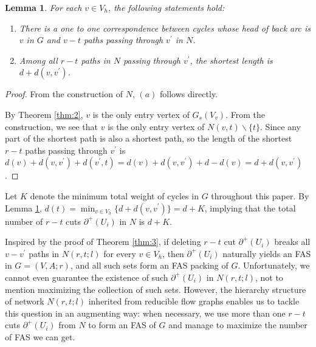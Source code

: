 \documentclass[11pt]{article}
\newtheorem{lemma}[theorem]{Lemma}
\begin{document}
\begin{lemma}
\label{lem:2}
For each $v\in V_h$, the following statements hold:
\begin{enumerate}[label=\emph{(}\alph*\emph{)}]
  \item There is a one to one correspondence between cycles whose head of back arc is $v$ in $G$ and $v-t$ paths passing through $v^\prime$ in $N$. 
  \item Among all $r-t$ paths in $N$ passing through $v^\prime$, the shortest length is $d+d(v,v^\prime)$.
\end{enumerate}
\end{lemma}
\begin{proof}
From the construction of $N$, $(a)$ follows directly.

By Theorem \ref{thm:2}, $v$ is the only entry vertex of $G_s(V_v)$. From the construction, we see that $v$ is the only entry vertex of $N(v,t)\backslash\{t\}$. Since any part of the shortest path is also a shortest path, so the length of the shortest $r-t$ paths passing through $v^\prime$ is $d(v)+d(v,v^\prime)+d(v^\prime,t)=d(v)+d(v,v^\prime)+d-d(v)=d+d(v,v^\prime)$.
\end{proof}

Let $K$ denote the minimum total weight of cycles in $G$ throughout this paper. By Lemma \ref{lem:2}, $d(t)=\min_{v\in V_h}\{d+d(v,v^\prime)\}=d+K$, implying that the total number of $r-t$ cuts $\partial^+(U_i)$ in $N$ is $d+K$.

Inspired by the proof of Theorem \ref{thm:3}, if deleting $r-t$ cut $\partial^+(U_i)$ breaks all $v-v^\prime$ paths in $N(r,t;l)$ for every $v\in V_h$, then $\partial^+(U_i)$ naturally yields an FAS in $G=(V,A;r)$, and all such sets form an FAS packing of $G$. Unfortunately, we cannot even guarantee the existence of such $\partial^+(U_i)$ in $N(r,t;l)$, not to mention maximizing the collection of such sets. However, the hierarchy structure of network $N(r,t;l)$ inherited from reducible flow graphs enables us to tackle this question in an augmenting way: when necessary, we use more than one $r-t$ cuts $\partial^+(U_i)$ from $N$ to form an FAS of $G$ and manage to maximize the number of FAS we can get.
\end{document}

